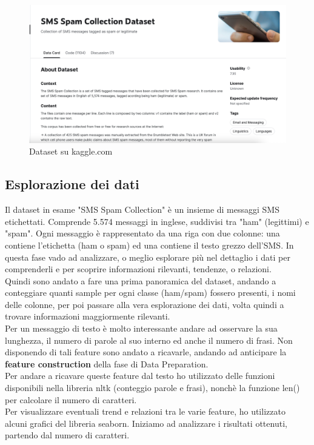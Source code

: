 \documentclass[]{article}
\begin{document}
        \begin{figure}[H]
            \centering
            \includegraphics[width=1\linewidth]{images/kaggleDataset.png}
            \caption{Dataset su kaggle.com}
            \label{fig:enter-label}
        \end{figure}

    \subsection{Esplorazione dei dati}
        Il dataset in esame "SMS Spam Collection" è un insieme di messaggi SMS etichettati. Comprende 5.574 messaggi in inglese, suddivisi tra "ham" (legittimi) e "spam". Ogni messaggio è rappresentato da una riga con due colonne: una contiene l'etichetta (ham o spam) ed una contiene il testo grezzo dell'SMS. In questa fase vado ad analizzare, o meglio esplorare più nel dettaglio i dati per comprenderli e per scoprire informazioni rilevanti, tendenze, o relazioni. \\
        Quindi sono andato a fare una prima panoramica del dataset, andando a conteggiare quanti sample per ogni classe (ham/spam) fossero presenti, i nomi delle colonne, per poi passare alla vera esplorazione dei dati, volta quindi a trovare informazioni maggiormente rilevanti.\\
        Per un messaggio di testo è molto interessante andare ad osservare la sua lunghezza, il numero di parole al suo interno ed anche il numero di frasi. Non disponendo di tali feature sono andato a ricavarle, andando ad anticipare la \textbf{feature construction} della fase di Data Preparation.\\
        Per andare a ricavare queste feature dal testo ho utilizzato delle funzioni disponibili nella libreria nltk (conteggio parole e frasi), nonchè la funzione len() per calcolare il numero di caratteri. \\
        Per visualizzare eventuali trend e relazioni tra le varie feature, ho utilizzato alcuni grafici del libreria seaborn. Iniziamo ad analizzare i risultati ottenuti, partendo dal numero di caratteri.
\end{document}
